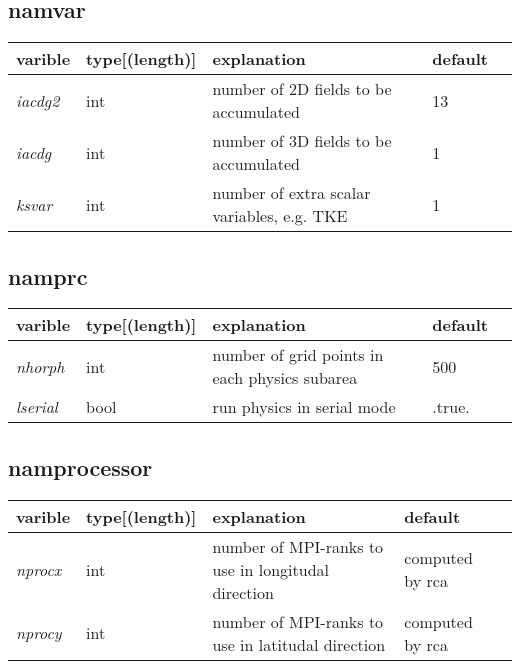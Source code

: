 \documentclass{article}
\begin{document}
\subsection{namvar}
\begin{tabular}{|l|l|l|l|l|}
  \hline
  varible & type[(length)] & explanation & default \\
  \hline
  \hline
  \emph{iacdg2} & int & number of 2D fields to be accumulated & 13 \\
  \emph{iacdg} & int & number of 3D fields to be accumulated & 1\\
  \emph{ksvar} & int & number of extra scalar variables, e.g. TKE & 1 \\
  \hline
\end{tabular}

\subsection{namprc}
\begin{tabular}{|l|l|l|l|l|}
  \hline
  varible & type[(length)] & explanation & default \\
  \hline
  \hline
  \emph{nhorph} & int & number of grid points in each physics subarea & 500  \\
  \emph{lserial} & bool & run physics in serial mode &  .true. \\
  \hline
\end{tabular}

\subsection{namprocessor}
\begin{tabular}{|l|l|l|l|l|}
  \hline
  varible & type[(length)] & explanation & default \\
  \hline
  \hline
  \emph{nprocx} & int & number of MPI-ranks to use in longitudal direction  & computed by rca \\
   \emph{nprocy}  & int & number of MPI-ranks to use in latitudal direction &  computed by rca\\
  \hline
\end{tabular}
\end{document}
